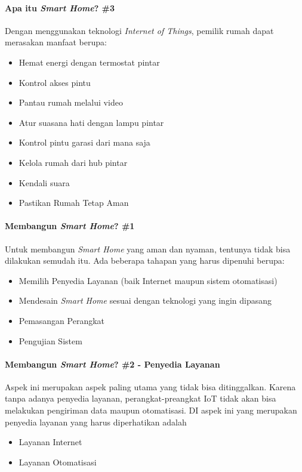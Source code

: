 \begin{frame}{\insertsectionhead}
	\framesubtitle{Apa itu \textit{Smart Home}? \#3}
	\justifying
	Dengan menggunakan teknologi \textit{Internet of Things}, pemilik rumah dapat merasakan  manfaat berupa:
	\vfill
	\begin{itemize}
		\item Hemat energi dengan termostat pintar
		\item Kontrol akses pintu
		\item Pantau rumah melalui video
		\item Atur suasana hati dengan lampu pintar
		\item Kontrol pintu garasi dari mana saja
		\item Kelola rumah dari hub pintar
		\item Kendali suara
		\item Pastikan Rumah Tetap Aman
	\end{itemize}
\end{frame}

\begin{frame}{\insertsectionhead}
	\framesubtitle{Membangun \textit{Smart Home}? \#1}
	\justifying
	Untuk membangun \textit{Smart Home} yang aman dan nyaman, tentunya tidak bisa dilakukan semudah itu. Ada beberapa tahapan yang harus dipenuhi berupa:
	\vfill
	\begin{itemize}
		\item Memilih Penyedia Layanan (baik Internet maupun sistem otomatisasi)
		\item Mendesain \textit{Smart Home} sesuai dengan teknologi yang ingin dipasang
		\item Pemasangan Perangkat
		\item Pengujian Sistem
	\end{itemize}
\end{frame}

\begin{frame}{\insertsectionhead}
	\framesubtitle{Membangun \textit{Smart Home}? \#2 - Penyedia Layanan}
	\justifying
	Aspek ini merupakan aspek paling utama yang tidak bisa ditinggalkan. Karena tanpa adanya penyedia layanan, perangkat-preangkat IoT tidak akan bisa melakukan pengiriman data maupun otomatisasi. DI aspek ini yang merupakan penyedia layanan yang harus diperhatikan adalah
	\vfill
	\begin{itemize}
		\item Layanan Internet
		\item Layanan Otomatisasi
	\end{itemize}
\end{frame}

